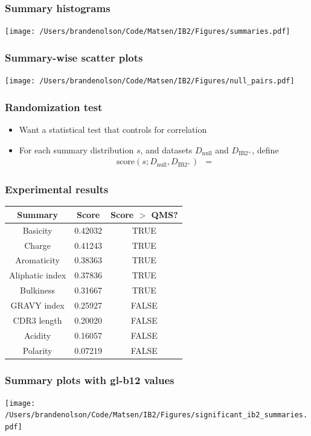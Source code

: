 \documentclass[mathserif,compress]{beamer}
\newcommand*\ba{\[ \begin{aligned}}
\newcommand*\ea{\end{aligned} \]}
\renewcommand\;{\,}
\begin{document}
\begin{frame}\frametitle{Summary histograms}
\begin{center}
\texttt{[image: /Users/brandenolson/Code/Matsen/IB2/Figures/summaries.pdf]}
\end{center}
\end{frame}

\begin{frame}\frametitle{Summary-wise scatter plots}
\begin{center}
\texttt{[image: /Users/brandenolson/Code/Matsen/IB2/Figures/null\_pairs.pdf]}
\end{center}
\end{frame}

\begin{frame}\frametitle{Randomization test}
\begin{itemize}
\item
Want a statistical test that controls for correlation
\bigskip
\item
For each summary distribution $s$, and datasets $D_\text{null}$ and $D_\text{IB2$^+$}$, define
\ba
\text{score}(s; D_\text{null}, D_\text{IB2$^+$})
	& = 
\ea
\end{itemize}
\end{frame}

\begin{frame}\frametitle{Experimental results}
\begin{center}
\begin{tabular}{c|c|c}
Summary & Score & Score $>$ QMS? \\
\hline
Basicity & 0.42032 & TRUE \\
Charge & 0.41243 & TRUE \\
Aromaticity & 0.38363 & TRUE \\
Aliphatic index & 0.37836 & TRUE \\
Bulkiness & 0.31667 & TRUE \\
GRAVY index & 0.25927 & FALSE \\
CDR3 length & 0.20020 & FALSE \\
Acidity & 0.16057 & FALSE \\
Polarity & 0.07219 & FALSE \\
\end{tabular}
\end{center}
\end{frame}

\begin{frame}\frametitle{Summary plots with gl-b12 values}
\begin{center}
\texttt{[image: /Users/brandenolson/Code/Matsen/IB2/Figures/significant\_ib2\_summaries.pdf]}
\end{center}
\end{frame}
\end{document}
